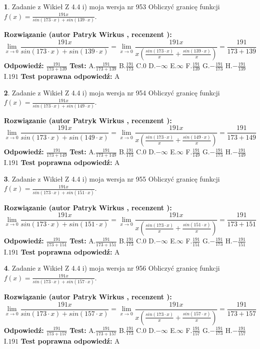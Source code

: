 \documentclass[12pt, a4paper]{article}
\theoremstyle{definition} %
\newtheorem{zad}{}
\newcommand{\zadStart}[1]{\begin{zad}#1\newline}
\newcommand{\zadStop}{\end{zad}}
\newcommand{\rozwStart}[2]{\noindent \textbf{Rozwiązanie (autor #1 , recenzent #2): }\newline}
\newcommand{\rozwStop}{\newline}
\newcommand{\odpStart}{\noindent \textbf{Odpowiedź:}\newline}
\newcommand{\odpStop}{\newline}
\newcommand{\testStart}{\noindent \textbf{Test:}\newline}
\newcommand{\testStop}{\newline}
\newcommand{\kluczStart}{\noindent \textbf{Test poprawna odpowiedź:}\newline}
\newcommand{\kluczStop}{\newline}
\begin{document}
\zadStart{Zadanie z Wikieł Z 4.4 i) moja wersja nr 953}
Obliczyć granicę funkcji $f(x)=\frac{191x}{sin(173\cdot x) +sin(139\cdot x)}$.
\zadStop
\rozwStart{Patryk Wirkus}{}
$$\lim\limits_{x\to 0}\frac{191x}{sin(173\cdot x) +sin(139\cdot x)}=\lim\limits_{x\to 0}\frac{191x}{x(\frac{sin(173\cdot x)}{x}+\frac{sin(139\cdot x)}{x})}=\frac{191}{173+139}$$
\rozwStop
\odpStart
$\frac{191}{173+139}$
\odpStop
\testStart
A.$\frac{191}{173+139}$
B.$\frac{191}{173}$
C.$0$
D.$-\infty$
E.$\infty$
F.$\frac{191}{139}$
G.$-\frac{191}{173}$
H.$-\frac{191}{139}$
I.$191$
\testStop
\kluczStart
A
\kluczStop



\zadStart{Zadanie z Wikieł Z 4.4 i) moja wersja nr 954}
Obliczyć granicę funkcji $f(x)=\frac{191x}{sin(173\cdot x) +sin(149\cdot x)}$.
\zadStop
\rozwStart{Patryk Wirkus}{}
$$\lim\limits_{x\to 0}\frac{191x}{sin(173\cdot x) +sin(149\cdot x)}=\lim\limits_{x\to 0}\frac{191x}{x(\frac{sin(173\cdot x)}{x}+\frac{sin(149\cdot x)}{x})}=\frac{191}{173+149}$$
\rozwStop
\odpStart
$\frac{191}{173+149}$
\odpStop
\testStart
A.$\frac{191}{173+149}$
B.$\frac{191}{173}$
C.$0$
D.$-\infty$
E.$\infty$
F.$\frac{191}{149}$
G.$-\frac{191}{173}$
H.$-\frac{191}{149}$
I.$191$
\testStop
\kluczStart
A
\kluczStop



\zadStart{Zadanie z Wikieł Z 4.4 i) moja wersja nr 955}
Obliczyć granicę funkcji $f(x)=\frac{191x}{sin(173\cdot x) +sin(151\cdot x)}$.
\zadStop
\rozwStart{Patryk Wirkus}{}
$$\lim\limits_{x\to 0}\frac{191x}{sin(173\cdot x) +sin(151\cdot x)}=\lim\limits_{x\to 0}\frac{191x}{x(\frac{sin(173\cdot x)}{x}+\frac{sin(151\cdot x)}{x})}=\frac{191}{173+151}$$
\rozwStop
\odpStart
$\frac{191}{173+151}$
\odpStop
\testStart
A.$\frac{191}{173+151}$
B.$\frac{191}{173}$
C.$0$
D.$-\infty$
E.$\infty$
F.$\frac{191}{151}$
G.$-\frac{191}{173}$
H.$-\frac{191}{151}$
I.$191$
\testStop
\kluczStart
A
\kluczStop



\zadStart{Zadanie z Wikieł Z 4.4 i) moja wersja nr 956}
Obliczyć granicę funkcji $f(x)=\frac{191x}{sin(173\cdot x) +sin(157\cdot x)}$.
\zadStop
\rozwStart{Patryk Wirkus}{}
$$\lim\limits_{x\to 0}\frac{191x}{sin(173\cdot x) +sin(157\cdot x)}=\lim\limits_{x\to 0}\frac{191x}{x(\frac{sin(173\cdot x)}{x}+\frac{sin(157\cdot x)}{x})}=\frac{191}{173+157}$$
\rozwStop
\odpStart
$\frac{191}{173+157}$
\odpStop
\testStart
A.$\frac{191}{173+157}$
B.$\frac{191}{173}$
C.$0$
D.$-\infty$
E.$\infty$
F.$\frac{191}{157}$
G.$-\frac{191}{173}$
H.$-\frac{191}{157}$
I.$191$
\testStop
\kluczStart
A
\kluczStop
\end{document}
